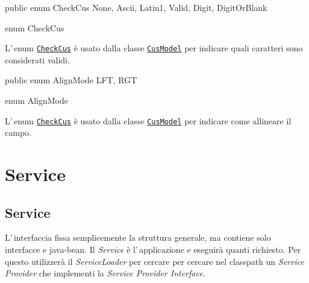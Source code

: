 \documentclass[a4paper,10pt]{report}
\newif\ifesource
\newenvironment{elisting}[1][H]
  {\captionsetup{aboveskip=0pt}\begin{listing}[#1]}
  {\end{listing}%
}
\begin{document}
\ifesource
\begin{lstlisting}[language=java, 
caption=enum CheckCus, 
label=lst:CheckCus]
public enum CheckCus { None, Ascii, Latin1, Valid, Digit, DigitOrBlank }
\end{lstlisting}\index{CheckCus}
\else
\begin{elisting}
\begin{javacode}
public enum CheckCus { None, Ascii, Latin1, Valid, Digit, DigitOrBlank }
\end{javacode}
\caption{enum CheckCus}\label{lst:CheckCus}
\end{elisting}
\fi
L'\,enum \hyperref[lst:CheckCus]{\texttt{CheckCus}} è usato dalla classe
\hyperref[lst:CusModel]{\texttt{CusModel}} per indicare quali caratteri sono
considerati validi.



\ifesource
\begin{lstlisting}[language=java, 
caption=enum AlignMode, 
label=lst:AlignMode]
public enum AlignMode { LFT, RGT }
\end{lstlisting}\index{AlignMode}
\else
\begin{elisting}
\begin{javacode}
public enum AlignMode { LFT, RGT }
\end{javacode}
\caption{enum AlignMode}\label{lst:AlignMode}
\end{elisting}
\fi
L'\,enum \hyperref[lst:CheckCus]{\texttt{CheckCus}} è usato dalla classe
\hyperref[lst:CusModel]{\texttt{CusModel}} per indicare come allineare il campo.


\vfill

\part{Service}

%                                  

\chapter{Service}
L'\,interfaccia fissa semplicemente la struttura generale, ma contiene solo
interfacce e java-bean.
Il \textsl{Service} è l'\,applicazione e eseguirà quanti richiesto.
Per questo utilizzerà il \textsl{ServiceLoader} per cercare per cercare nel 
classpath un \textsl{Service Provider} che implementi la \textsl{Service 
Provider Interface}.
\end{document}
